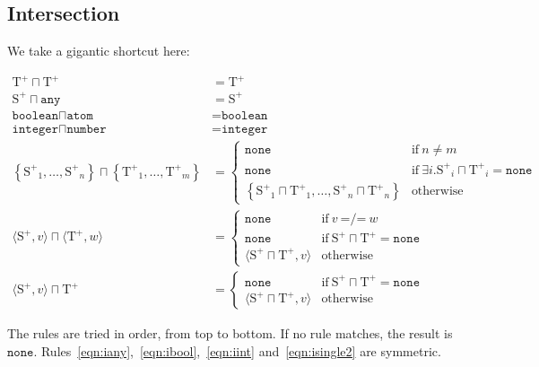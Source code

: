 \documentclass[nonacm,timestamp,manuscript]{acmart}
\newcommand{\atom}[1]{\texttt{#1}}
\newcommand{\singleton}[2]{\langle #1, #2 \rangle} %
\newcommand{\type}{\text{T}}
\newcommand{\types}{\text{S}}
\newcommand{\postype}{{\type}^{+}}
\newcommand{\postypes}{{\types}^{+}}
\newcommand{\res}[1]{\texttt{#1}}
\begin{document}
\subsection{Intersection}

We take a gigantic shortcut here:

\begin{definition}
  \newcommand{\intersect}{\sqcap}
  \begin{align}
    \postype \intersect \postype & = \postype \label{eqn:irefl} \\
    \postypes \intersect \atom{any} & = \postypes \label{eqn:iany} \\
    \atom{boolean} \intersect \atom{atom} & = \atom{boolean} \label{eqn:ibool} \\
    \atom{integer} \intersect \atom{number} & = \atom{integer} \label{eqn:iint} \\
    \left\{ {\postypes}_1, \ldots, {\postypes}_n \right\} \intersect \left\{ {\postype}_1, \ldots, {\postype}_m \right\}
                                   & = \begin{cases}
                                     \atom{none} & \text{if}\ n \ne m \\
                                     \atom{none} & \text{if}\ \exists{} i . {\postypes}_i \intersect {\postype}_i = \atom{none} \\
                                     \left\{ {\postypes}_1 \intersect {\postype}_1, \ldots, {\postypes}_n \intersect {\postype}_n \right\} & \text{otherwise}
                                   \end{cases} \label{eqn:ituple} \\
    \singleton{\postypes}{v} \intersect \singleton{\postype}{w}
                                    & = \begin{cases}
                                      \atom{none} & \text{if}\ v\ \res{=/=}\ w \\
                                      \atom{none} & \text{if}\ \postypes \intersect \postype = \atom{none} \\
                                      \singleton{\postypes \intersect \postype}{v} & \text{otherwise}
                                    \end{cases} \label{eqn:isingle1} \\
    \singleton{\postypes}{v} \intersect \postype
                                 & = \begin{cases}
                                   \atom{none} & \text{if}\ \postypes \intersect \postype = \atom{none} \\
                                   \singleton{\postypes \intersect \postype}{v} & \text{otherwise}
                                   \end{cases} \label{eqn:isingle2}                                                                                     
  \end{align}
\end{definition}
The rules are tried in order, from top to bottom. If no rule matches, the result
is $\atom{none}$. Rules~\ref{eqn:iany},~\ref{eqn:ibool},~\ref{eqn:iint}
and~\ref{eqn:isingle2} are symmetric.
\end{document}
